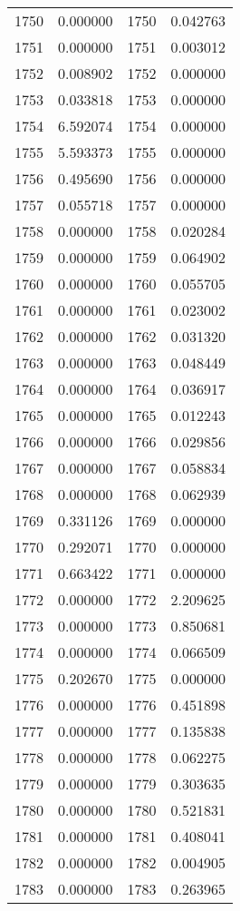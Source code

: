 \documentclass[12pt]{article}
\begin{document}
\begin{longtable}{@{}cccc@{}}
1750 & 0.000000 & 1750 & 0.042763 \\
1751 & 0.000000 & 1751 & 0.003012 \\
1752 & 0.008902 & 1752 & 0.000000 \\
1753 & 0.033818 & 1753 & 0.000000 \\
1754 & 6.592074 & 1754 & 0.000000 \\
1755 & 5.593373 & 1755 & 0.000000 \\
1756 & 0.495690 & 1756 & 0.000000 \\
1757 & 0.055718 & 1757 & 0.000000 \\
1758 & 0.000000 & 1758 & 0.020284 \\
1759 & 0.000000 & 1759 & 0.064902 \\
1760 & 0.000000 & 1760 & 0.055705 \\
1761 & 0.000000 & 1761 & 0.023002 \\
1762 & 0.000000 & 1762 & 0.031320 \\
1763 & 0.000000 & 1763 & 0.048449 \\
1764 & 0.000000 & 1764 & 0.036917 \\
1765 & 0.000000 & 1765 & 0.012243 \\
1766 & 0.000000 & 1766 & 0.029856 \\
1767 & 0.000000 & 1767 & 0.058834 \\
1768 & 0.000000 & 1768 & 0.062939 \\
1769 & 0.331126 & 1769 & 0.000000 \\
1770 & 0.292071 & 1770 & 0.000000 \\
1771 & 0.663422 & 1771 & 0.000000 \\
1772 & 0.000000 & 1772 & 2.209625 \\
1773 & 0.000000 & 1773 & 0.850681 \\
1774 & 0.000000 & 1774 & 0.066509 \\
1775 & 0.202670 & 1775 & 0.000000 \\
1776 & 0.000000 & 1776 & 0.451898 \\
1777 & 0.000000 & 1777 & 0.135838 \\
1778 & 0.000000 & 1778 & 0.062275 \\
1779 & 0.000000 & 1779 & 0.303635 \\
1780 & 0.000000 & 1780 & 0.521831 \\
1781 & 0.000000 & 1781 & 0.408041 \\
1782 & 0.000000 & 1782 & 0.004905 \\
1783 & 0.000000 & 1783 & 0.263965 \\

\end{longtable}
\end{document}
